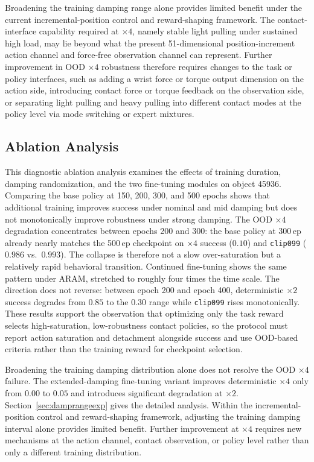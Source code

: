 Broadening the training damping range alone provides limited benefit
under the current incremental-position control and reward-shaping
framework. The contact-interface capability required at $\times4$, namely
stable light pulling under sustained high load, may lie beyond what
the present 51-dimensional position-increment action channel and
force-free observation channel can represent. Further improvement in
OOD $\times4$ robustness therefore requires changes to the task or policy
interfaces, such as adding a wrist force or torque output dimension
on the action side, introducing contact force or torque feedback on
the observation side, or separating light pulling and heavy pulling
into different contact modes at the policy level via mode switching
or expert mixtures.


\subsection{Ablation Analysis}
\label{sec:ablation}

This diagnostic ablation analysis examines the effects of training
duration, damping randomization, and the two fine-tuning modules on
object 45936. Comparing
the base policy at 150, 200, 300, and 500 epochs shows that additional
training improves success under nominal and mid damping but does not
monotonically improve robustness under strong damping. The OOD $\times4$
degradation concentrates between epochs 200 and 300:
the base policy at 300\,ep already nearly matches the 500\,ep checkpoint on
$\times4$ success ($0.10$) and \texttt{clip099} ($0.986$ vs.~$0.993$).
The collapse is therefore not a slow over-saturation but a
relatively rapid behavioral transition. Continued fine-tuning shows
the same pattern under ARAM, stretched to roughly four times the
time scale. The direction does not reverse: between
epoch 200 and epoch 400, deterministic $\times2$ success
degrades from $0.85$ to the $0.30$ range while \texttt{clip099}
rises monotonically. These results support the observation that
optimizing only the task reward selects high-saturation,
low-robustness contact policies, so the protocol must report action
saturation and detachment alongside success and use OOD-based
criteria rather than the training reward for checkpoint selection.

Broadening the training damping distribution alone does not resolve
the OOD $\times4$ failure. The extended-damping fine-tuning variant
improves deterministic $\times4$ only from $0.00$ to $0.05$ and
introduces significant degradation at $\times2$. Section~\ref{sec:damprangeexp}
gives the detailed analysis. Within the incremental-position control
and reward-shaping framework, adjusting the training damping
interval alone provides limited benefit. Further improvement at
$\times4$ requires new mechanisms at the action channel, contact
observation, or policy level rather than only a different training
distribution.

